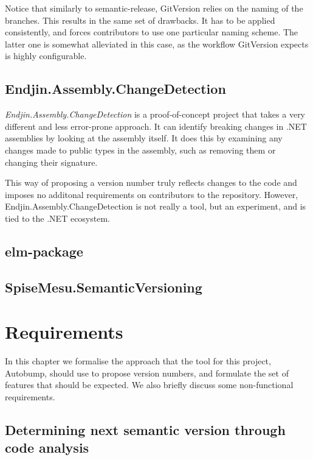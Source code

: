 \documentclass{l4proj}
\begin{document}
Notice that similarly to semantic-release, GitVersion relies on the
naming of the branches. This results in the same set of drawbacks. It
has to be applied consistently, and forces contributors to use one
particular naming scheme. The latter one is somewhat alleviated in
this case, as the workflow GitVersion expects is highly
configurable\cite{GitVersionConfiguration}.

\section{Endjin.Assembly.ChangeDetection}

\textit{Endjin.Assembly.ChangeDetection}\cite{Endjin} is a
proof-of-concept project that takes a very different and less
error-prone approach. It can identify breaking changes in .NET
assemblies by looking at the assembly itself. It does this
by examining any changes made to public types in the assembly, such as
removing them or changing their signature.

This way of proposing a version number truly reflects changes to
the code and imposes no additonal requirements on contributors to
the repository. However, Endjin.Assembly.ChangeDetection is not really
a tool, but an experiment, and is tied to the .NET ecosystem.

\section{elm-package}

\section{SpiseMesu.SemanticVersioning}


\chapter{Requirements}
\label{Requirements}

In this chapter we formalise the approach that the tool for this
project, Autobump, should use to propose version numbers, and
formulate the set of features that should be expected. We also briefly
discuss some non-functional requirements.

\section{Determining next semantic version through code analysis}
\end{document}
